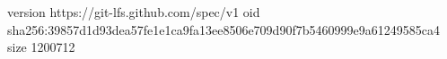 version https://git-lfs.github.com/spec/v1
oid sha256:39857d1d93dea57fe1e1ca9fa13ee8506e709d90f7b5460999e9a61249585ca4
size 1200712
